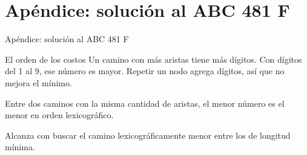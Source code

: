 \section{Apéndice: solución al ABC 481 F}

\begin{frame}
  \vspace{1.5cm}
  \centering
  {\LARGE Apéndice: solución al ABC 481 F}
\end{frame}

\begin{frame}{El orden de los costos}
  Un camino con más aristas tiene más dígitos.
  Con dígitos del 1 al 9, ese número es mayor.
  Repetir un nodo agrega dígitos, así que no mejora el mínimo.

  \medskip
  Entre dos caminos con la misma cantidad de aristas, el menor número es el menor en orden lexicográfico.

  \medskip
  Alcanza con buscar el camino lexicográficamente menor entre los de longitud mínima.
\end{frame}

